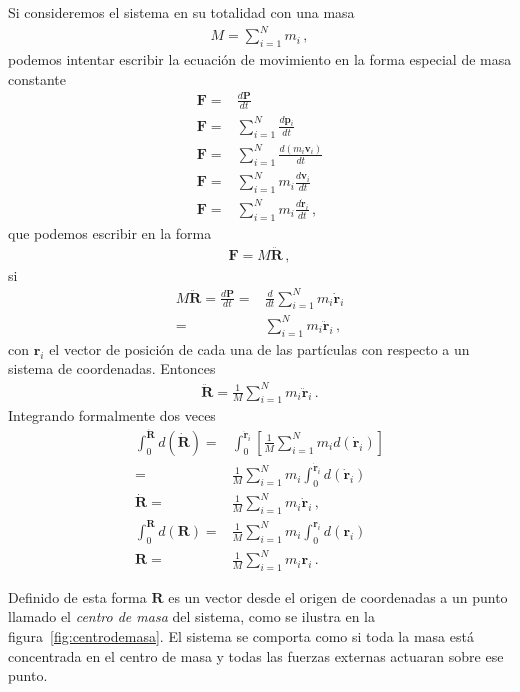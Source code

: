 Si consideremos el sistema en su totalidad con una masa
\begin{align}
  M=\sum_{i=1}^N m_i\,,
\end{align}
podemos intentar escribir la ecuación de movimiento en la forma especial de masa constante
\begin{align}
    \mathbf{F}=&\frac{d\mathbf{P}}{dt}\nonumber\\
    \mathbf{F}=&\sum_{i=1}^N\frac{d\mathbf{p}_i}{dt}\nonumber\\
    \mathbf{F}=&\sum_{i=1}^N\frac{d(m_i\mathbf{v}_i)}{dt}\nonumber\\
    \mathbf{F}=&\sum_{i=1}^Nm_i\frac{d\mathbf{v}_i}{dt}\nonumber\\
    \mathbf{F}=&\sum_{i=1}^Nm_i\frac{d\dot{\mathbf{r}}_i}{dt}\,,
\end{align}
que podemos escribir en la forma
\begin{align}
  \label{eq:mcm}
  \mathbf{F}=M\ddot{\mathbf{R}}\,,
\end{align}
si
\begin{align}
  M\ddot{\mathbf{R}}=\frac{d\mathbf{P}}{dt}=&\frac{d}{dt}\sum_{i=1}^N m_i\dot{\mathbf{r}}_i\nonumber\\
=&\sum_{i=1}^N m_i\ddot{\mathbf{r}}_i\,,
\end{align}
con $\mathbf{r}_i$ el vector de posición de cada una de las partículas con respecto a un sistema de coordenadas. Entonces
\begin{align}
\label{eq:mveccm}
  \ddot{\mathbf{R}}=\frac{1}{M}\sum_{i=1}^Nm_i\ddot{\mathbf{r}}_i\,.
\end{align}
Integrando formalmente dos veces
\begin{align}
  \int_0^{\dot{\mathbf{R}}}d(\dot{\mathbf{R}})
=&\int_0^{\dot{\mathbf{r}}_i}\left[\frac{1}{M}
  \sum_{i=1}^N m_i d(\dot{\mathbf{r}}_i) \right]\nonumber\\
=&\frac{1}{M}
  \sum_{i=1}^N m_i\int_0^{\dot{\mathbf{r}}_i}d(\dot{\mathbf{r}}_i)\nonumber\\
  \dot{\mathbf{R}}=&\frac{1}{M}
  \sum_{i=1}^N m_i\dot{\mathbf{r}}_i\,,\nonumber\\
  \int_0^{{\mathbf{R}}}d({\mathbf{R}})=&\frac{1}{M}
  \sum_{i=1}^N m_i\int_0^{{\mathbf{r}}_i}d({\mathbf{r}}_i)\nonumber\\
  {\mathbf{R}}=&\frac{1}{M}
  \sum_{i=1}^N m_i{\mathbf{r}}_i\,.
\end{align}

Definido de esta forma $\mathbf{R}$ es un vector desde el origen de coordenadas a un punto llamado el \emph{centro de masa} del sistema, como se ilustra en la figura~\ref{fig:centrodemasa}. El sistema se comporta como si toda la masa está concentrada en el centro de masa y todas las fuerzas externas actuaran sobre ese punto.

